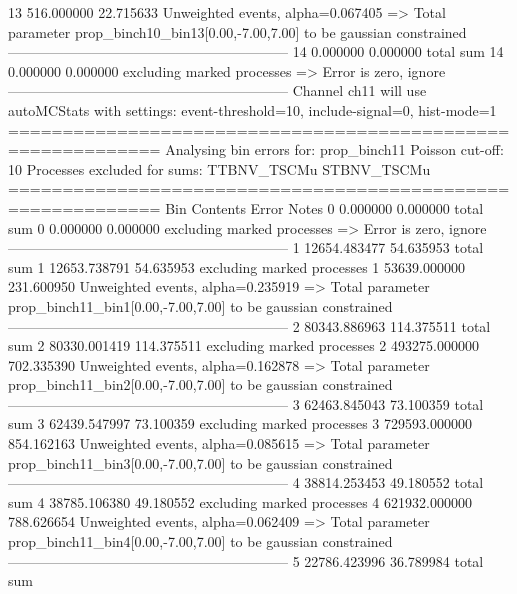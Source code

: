 13         516.000000      22.715633       Unweighted events, alpha=0.067405
  => Total parameter prop_binch10_bin13[0.00,-7.00,7.00] to be gaussian constrained
------------------------------------------------------------
14         0.000000        0.000000        total sum                     
14         0.000000        0.000000        excluding marked processes    
  => Error is zero, ignore      
------------------------------------------------------------
Channel ch11 will use autoMCStats with settings: event-threshold=10, include-signal=0, hist-mode=1
============================================================
Analysing bin errors for: prop_binch11
Poisson cut-off: 10
Processes excluded for sums: TTBNV_TSCMu STBNV_TSCMu
============================================================
Bin        Contents        Error           Notes                         
0          0.000000        0.000000        total sum                     
0          0.000000        0.000000        excluding marked processes    
  => Error is zero, ignore      
------------------------------------------------------------
1          12654.483477    54.635953       total sum                     
1          12653.738791    54.635953       excluding marked processes    
1          53639.000000    231.600950      Unweighted events, alpha=0.235919
  => Total parameter prop_binch11_bin1[0.00,-7.00,7.00] to be gaussian constrained
------------------------------------------------------------
2          80343.886963    114.375511      total sum                     
2          80330.001419    114.375511      excluding marked processes    
2          493275.000000   702.335390      Unweighted events, alpha=0.162878
  => Total parameter prop_binch11_bin2[0.00,-7.00,7.00] to be gaussian constrained
------------------------------------------------------------
3          62463.845043    73.100359       total sum                     
3          62439.547997    73.100359       excluding marked processes    
3          729593.000000   854.162163      Unweighted events, alpha=0.085615
  => Total parameter prop_binch11_bin3[0.00,-7.00,7.00] to be gaussian constrained
------------------------------------------------------------
4          38814.253453    49.180552       total sum                     
4          38785.106380    49.180552       excluding marked processes    
4          621932.000000   788.626654      Unweighted events, alpha=0.062409
  => Total parameter prop_binch11_bin4[0.00,-7.00,7.00] to be gaussian constrained
------------------------------------------------------------
5          22786.423996    36.789984       total sum                     
